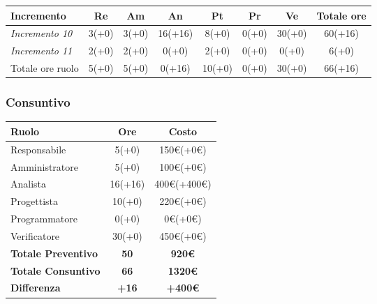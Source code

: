 {{{{{{{{{{{	\begin{center}
		\renewcommand{\arraystretch}{1.4}
		\begin{tabularx}{\textwidth}{|X|c|c|c|c|c|c|c|}
			\hline
			\rowcolor{airforceblue}
			\textbf{Incremento} & \textbf{Re} & \textbf{Am} & \textbf{An} & \textbf{Pt} & \textbf{Pr} & \textbf{Ve} & \textbf{Totale ore}\\
			\hline
			\textit{Incremento 10} & 3(+0) & 3(+0) & 16(+16) & 8(+0) & 0(+0) & 30(+0) & 60(+16)\\
			\hline
			\textit{Incremento 11} & 2(+0) & 2(+0) & 0(+0) & 2(+0) & 0(+0) & 0(+0) & 6(+0)\\
			\hline
			Totale ore ruolo & 5(+0) & 5(+0) & 0(+16) & 10(+0) & 0(+0) & 30(+0) & 66(+16)\\
			\hline
		\end{tabularx}
	\end{center}

	
	\subsubsection{Consuntivo}\label{ConsuntivoTerzoPeriodoDiProgettazioneDiDettaglioCodificaIncrementiCosto}
	
	\quad
	\def\tabularxcolumn#1{m{#1}}
	{
		\begin{center}
			\renewcommand{\arraystretch}{1.4}
			\begin{tabularx}{10cm}{|X|c|c|}
				\hline
				\rowcolor{airforceblue}
				\textbf{Ruolo} & \textbf{Ore} & \textbf{Costo}\\
				\hline
				Responsabile & 5(+0) & 150\euro(+0\euro)\\
				\hline
				Amministratore & 5(+0) & 100\euro(+0\euro)\\
				\hline
				Analista & 16(+16) & 400\euro(+400\euro)\\
				\hline
				Progettista & 10(+0) & 220\euro(+0\euro)\\
				\hline
				Programmatore & 0(+0) & 0\euro(+0\euro)\\
				\hline
				Verificatore & 30(+0) & 450\euro(+0\euro)\\
				\hline
				\textbf{Totale Preventivo} & \textbf{50} & \textbf{920\euro}\\
				\hline
				\textbf{Totale Consuntivo} & \textbf{66} & \textbf{1320\euro}\\
				\hline
				\textbf{Differenza} & \textbf{+16} & \textbf{+400\euro}
			\end{tabularx}
		\end{center}
		
}}}}}}}}}}}}
